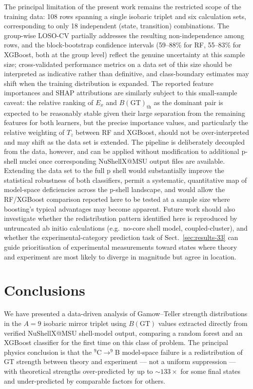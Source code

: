 \documentclass[10pt,twocolumn]{article}
\begin{document}
The principal limitation of the present work remains the restricted scope of the training data: 108 rows spanning a single isobaric triplet and six calculation sets, corresponding to only 18 independent (state, transition) combinations. The group-wise LOSO-CV partially addresses the resulting non-independence among rows, and the block-bootstrap confidence intervals (59--88\% for RF, 55--83\% for XGBoost, both at the group level) reflect the genuine uncertainty at this sample size; cross-validated performance metrics on a data set of this size should be interpreted as indicative rather than definitive, and class-boundary estimates may shift when the training distribution is expanded. The reported feature importances and SHAP attributions are similarly subject to this small-sample caveat: the relative ranking of $E_x$ and $B(\mathrm{GT})_{\mathrm{th}}$ as the dominant pair is expected to be reasonably stable given their large separation from the remaining features for both learners, but the precise importance values, and particularly the relative weighting of $T_z$ between RF and XGBoost, should not be over-interpreted and may shift as the data set is extended. The pipeline is deliberately decoupled from the data, however, and can be applied without modification to additional p-shell nuclei once corresponding NuShellX@MSU output files are available. Extending the data set to the full p shell would substantially improve the statistical robustness of both classifiers, permit a systematic, quantitative map of model-space deficiencies across the p-shell landscape, and would allow the RF/XGBoost comparison reported here to be tested at a sample size where boosting's typical advantages may become apparent. Future work should also investigate whether the redistribution pattern identified here is reproduced by untruncated ab initio calculations (e.g.\ no-core shell model, coupled-cluster), and whether the experimental-category prediction task of Sect.~\ref{sec:results-33} can guide prioritisation of experimental measurements toward states where theory and experiment are most likely to diverge in magnitude but agree in location.

\section{Conclusions}
\label{sec:conclusions}

We have presented a data-driven analysis of Gamow--Teller strength distributions in the $A = 9$ isobaric mirror triplet using $B(\mathrm{GT})$ values extracted directly from verified NuShellX@MSU shell-model output, comparing a random forest and an XGBoost classifier for the first time on this class of problem. The principal physics conclusion is that the $^{9}$C$\rightarrow^{9}$B model-space failure is a redistribution of GT strength between theory and experiment --- not a uniform suppression --- with theoretical strengths over-predicted by up to $\sim\!133\times$ for some final states and under-predicted by comparable factors for others.
\end{document}
